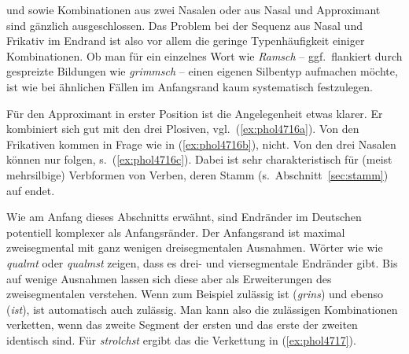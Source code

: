 \begin{exe}
  \ex\label{ex:phol4715}
  \begin{xlist}
  \end{xlist}
\end{exe}

\textipa{[mf]} und \textipa{[Nf]} sowie Kombinationen aus zwei Nasalen oder aus Nasal und Approximant sind gänzlich ausgeschlossen.
Das Problem bei der Sequenz aus Nasal und Frikativ im Endrand ist also vor allem die geringe Typenhäufigkeit einiger Kombinationen.
Ob man \zB für ein einzelnes Wort wie \textit{Ramsch} -- ggf.\ flankiert durch gespreizte Bildungen wie \textit{grimmsch} -- einen eigenen Silbentyp aufmachen möchte, ist wie bei ähnlichen Fällen im Anfangsrand kaum systematisch festzulegen.

Für den Approximant in erster Position ist die Angelegenheit etwas klarer.
Er kombiniert sich gut mit den drei Plosiven, vgl.\ (\ref{ex:phol4716a}).
Von den Frikativen kommen \textipa{[f s \c{c}]} in Frage wie in (\ref{ex:phol4716b}), \textipa{[S X K]} nicht.
Von den drei Nasalen können nur \textipa{[m n]} folgen, s.\ (\ref{ex:phol4716c}).
Dabei ist \textipa{[ln]} sehr charakteristisch für (meist mehrsilbige) Verbformen von Verben, deren Stamm (s.\ Abschnitt~\ref{sec:stamm}) auf \textipa{[l]} endet.

\begin{exe}
  \ex\label{ex:phol4716}
  \begin{xlist}
  \end{xlist}
\end{exe}

Wie am Anfang dieses Abschnitts erwähnt, sind Endränder im Deutschen potentiell komplexer als Anfangsränder.
Der Anfangsrand ist maximal zweisegmental mit ganz wenigen dreisegmentalen Ausnahmen.
Wörter wie wie \textit{qualmt} \textipa{[kvalmt]} oder \textit{qualmst} \textipa{[kvalmst]} zeigen, dass es drei- und viersegmentale Endränder gibt.
Bis auf wenige Ausnahmen lassen sich diese aber als Erweiterungen des zweisegmentalen verstehen.
Wenn zum Beispiel \textipa{[ns]} zulässig ist (\textit{grins}) und \textipa{[st]} ebenso (\textit{ist}), ist automatisch auch \textipa{[nst]} zulässig.
Man kann also die zulässigen Kombinationen verketten, wenn das zweite Segment der ersten und das erste der zweiten identisch sind.
Für \textit{strolchst} ergibt das die Verkettung in (\ref{ex:phol4717}).

